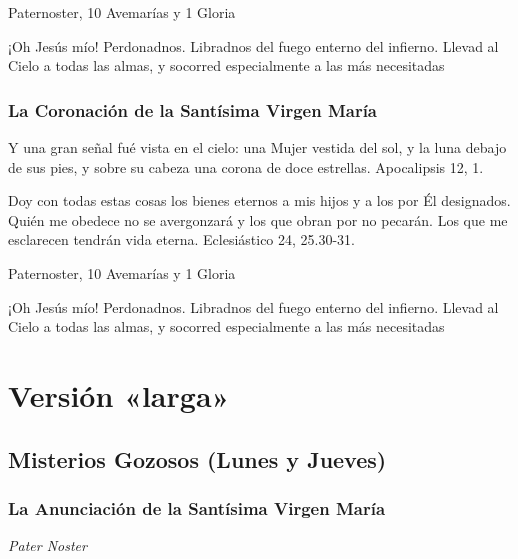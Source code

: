 \documentclass[a4paper,11pt, oneside]{report}
\begin{document}
         Paternoster, 10 Avemarías y 1 Gloria
        
        \medskip
        ¡Oh Jesús mío! Perdonadnos. Libradnos del fuego enterno del infierno. Llevad al Cielo a todas las almas, y socorred especialmente a las más 
        necesitadas

      \subsection*{La Coronación de la Santísima Virgen María}
        Y una gran señal fué vista en el cielo: una Mujer vestida del sol, y la luna debajo de sus pies, y sobre su cabeza una corona de doce estrellas.
        Apocalipsis 12, 1.

        \medskip
        Doy con todas estas cosas los bienes eternos a mis hijos y a los por Él designados. Quién me obedece no se avergonzará y los que obran por
        no pecarán. Los que me esclarecen tendrán vida eterna. Eclesiástico 24, 25.30-31.

         Paternoster, 10 Avemarías y 1 Gloria
        
        \medskip
        ¡Oh Jesús mío! Perdonadnos. Libradnos del fuego enterno del infierno. Llevad al Cielo a todas las almas, y socorred especialmente a las más 
        necesitadas

  \chapter*{Versión «larga»}

    \section*{ Misterios Gozosos (Lunes y Jueves)}
      
    \subsection*{ La Anunciación de la Santísima Virgen María }

      \textit{Pater Noster}
\end{document}

